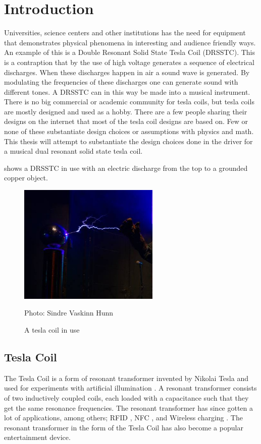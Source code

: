\chapter{Introduction}
\label{intro}
Universities, science centers and other institutions has the need for equipment that demonstrates physical phenomena in interesting and audience friendly ways. An example of this is a Double Resonant Solid State Tesla Coil (DRSSTC). This is a contraption that by the use of high voltage generates a sequence of electrical discharges. When these discharges happen in air a sound wave is generated. By modulating the frequencies of these discharges one can generate sound with different tones. A DRSSTC can in this way be made into a musical instrument.
There is no big commercial or academic community for tesla coils, but tesla coils are mostly designed and used as a hobby. There are a few people sharing their designs on the internet that most of the tesla coil designs are based on. Few or none of these substantiate design choices or assumptions with physics and math. This thesis will attempt to substantiate the design choices done in the driver for a musical dual resonant solid state tesla coil.

 shows a DRSSTC in use with an electric discharge from the top to a grounded copper object.

\begin{figure}[ht]
    \centering
    \includegraphics[width=0.6\textwidth]{img/teslabano.jpg}
    \caption{A tesla coil in use}
    Photo: Sindre Vaskinn Hunn
    \label{fig:teslabano}
\end{figure}

\section{Tesla Coil}
\label{tesla}
The Tesla Coil is a form of resonant transformer invented by Nikolai Tesla and used for experiments with artificial illumination \citep{5570149}. A resonant transformer consists of two inductively coupled coils, each loaded with a capacitance such that they get the same resonance frequencies. The resonant transformer has since gotten a lot of applications, among others; RFID \citep{b1960radio}, NFC \citep{5958681}, and Wireless charging \citep{5754800}. The resonant transformer in the form of the Tesla Coil has also become a popular entertainment device.

